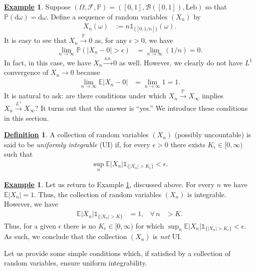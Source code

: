 \documentclass[12pt]{book}
\let\varepsilon\epsilon
\numberwithin{equation}{chapter}
\theoremstyle{plain}
\numberwithin{theorem}{section}
\theoremstyle{definition}
\newtheorem{definition}[theorem]{\underline{Definition}}
\newtheorem{example}[theorem]{\underline{Example}}
\numberwithin{exercise}{chapter}
\newcommand{\<}{\langle}
\renewcommand{\>}{\rangle}
\renewcommand{\(}{\left(}
\renewcommand{\)}{\right)}
\renewcommand{\[}{\left[}
\renewcommand{\]}{\right]}
\newcommand\Eb{\mathds{E}}
\newcommand\Ib{\mathds{1}} 	%
\newcommand\Pb{\mathds{P}}
\newcommand\Bc{\mathscr{B}}
\newcommand\Fc{\mathscr{F}}
\newcommand\eps{\varepsilon}
\newcommand\om{\omega}
\newcommand\Om{\Omega}
\newcommand\dd{\mathrm{d}}
\begin{document}
\begin{example}
\label{ex:not-UI}
Suppose $(\Om,\Fc,\Pb) = ([0,1],\Bc([0,1]),\text{Leb})$ so that $\Pb(\dd \om) = \dd \om$.  Define a sequence of random variables $(X_n)$ by
\begin{align}
X_n(\om)
	&:=	n \Ib_{\{[0,1/n]\}}(\om) .
\end{align}
It is easy to see that $X_n \stackrel{\Pb}{\to} 0$ as, for any $\eps > 0$, we have
\begin{align}
\lim_{n \to \infty} \Pb( |X_n - 0| > \eps )
	&=	\lim_{n \to \infty} (1/n) = 0 .
\end{align}
In fact, in this case, we have $X_n \stackrel{\text{a.s.}}{\to} 0$ as well.
However, we clearly do not have $L^1$ convergence of $X_n \to 0$ because
\begin{align}
\lim_{n \to \infty} \Eb |X_n - 0|
	&= \lim_{n \to \infty} 1 = 1 .
\end{align}
It is natural to ask: are there conditions under which $X_n \stackrel{\Pb}{\to} X_\infty$ implies $X_n \stackrel{L^1}{\to} X_\infty$?  It turns out that the answer is ``yes.''  We introduce these conditions in this section.
\end{example}

\begin{definition}
\label{def:UI}
A collection of random variables $(X_n)$ (possibly uncountable) is said to be \emph{uniformly integrable} (UI) if, for every $\eps > 0$ there exists $K_\eps \in [0,\infty)$ such that
\begin{align}
\sup_{n} \Eb |X_n| \Ib_{\{|X_n|>K_\eps\}}
	< \eps .
\end{align}
\end{definition}

\begin{example}
Let us return to Example \ref{ex:not-UI}, discussed above.  For every $n$ we have $\Eb | X_n | = 1$.  Thus, the collection of random variables $(X_n)$ is integrable.  However, we have
\begin{align}
\Eb |X_n| \Ib_{\{|X_n|>K\}}
	&=	1 , &
\forall \, n
	&> K .
\end{align}
Thus, for a given $\eps$ there is no $K_\eps \in [0,\infty)$ for which $\sup_n \Eb |X_n| \Ib_{\{|X_n|>K_\eps \}} < \eps$.  As such, we conclude that the collection $(X_n)$ is \emph{not} UI.
\end{example}

\noindent
Let us provide some simple conditions which, if satisfied by a collection of random variables, ensure uniform integrability.
\end{document}
